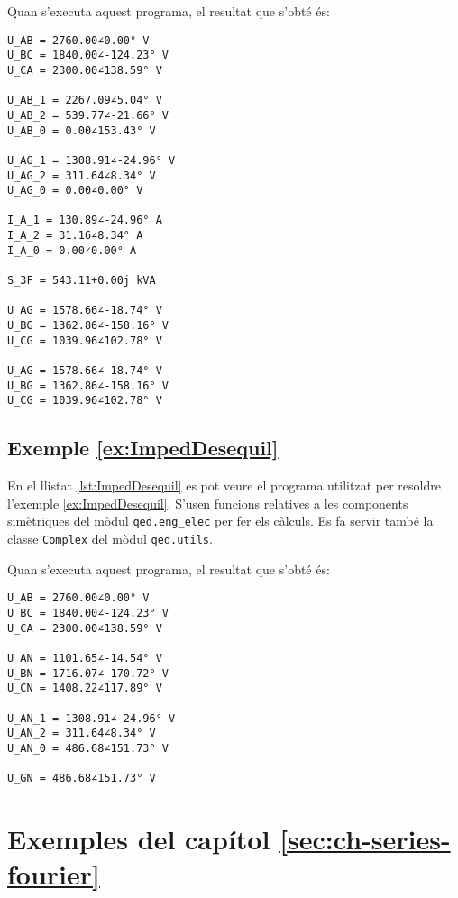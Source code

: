 Quan s'executa aquest programa, el resultat que s'obté és:
\lstset{
	language=,
	numbers=none,
	frame=none
}
\begin{lstlisting}
U_AB = 2760.00∠0.00° V
U_BC = 1840.00∠-124.23° V
U_CA = 2300.00∠138.59° V

U_AB_1 = 2267.09∠5.04° V
U_AB_2 = 539.77∠-21.66° V
U_AB_0 = 0.00∠153.43° V

U_AG_1 = 1308.91∠-24.96° V
U_AG_2 = 311.64∠8.34° V
U_AG_0 = 0.00∠0.00° V

I_A_1 = 130.89∠-24.96° A
I_A_2 = 31.16∠8.34° A
I_A_0 = 0.00∠0.00° A

S_3F = 543.11+0.00j kVA

U_AG = 1578.66∠-18.74° V
U_BG = 1362.86∠-158.16° V
U_CG = 1039.96∠102.78° V

U_AG = 1578.66∠-18.74° V
U_BG = 1362.86∠-158.16° V
U_CG = 1039.96∠102.78° V
\end{lstlisting}


\hypertarget{exemple:ImpedDesequil}{\subsection{Exemple \ref*{ex:ImpedDesequil} \ImpedDesequil}}
En el llistat \vref{lst:ImpedDesequil} es pot veure el programa utilitzat per resoldre l'exemple \vref{ex:ImpedDesequil}. S'usen funcions relatives a les components simètriques del mòdul \texttt{qed.eng\_elec} per fer els càlculs. Es fa servir també la classe \texttt{Complex} del mòdul \texttt{qed.utils}.


Quan s'executa aquest programa, el resultat que s'obté és:
\lstset{
	language=,
	numbers=none,
	frame=none
}
\begin{lstlisting}
U_AB = 2760.00∠0.00° V
U_BC = 1840.00∠-124.23° V
U_CA = 2300.00∠138.59° V

U_AN = 1101.65∠-14.54° V
U_BN = 1716.07∠-170.72° V
U_CN = 1408.22∠117.89° V

U_AN_1 = 1308.91∠-24.96° V
U_AN_2 = 311.64∠8.34° V
U_AN_0 = 486.68∠151.73° V

U_GN = 486.68∠151.73° V
\end{lstlisting}




\section{Exemples del capítol \ref*{sec:ch-series-fourier}}

